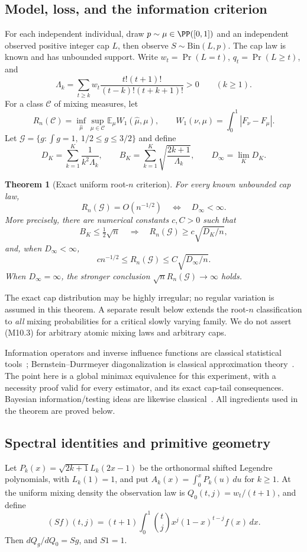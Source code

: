 \documentclass[11pt,a4paper]{article}
\newtheorem{theorem}{Theorem}[section]
\theoremstyle{definition}\newtheorem{definition}[theorem]{Definition}
\theoremstyle{remark}\newtheorem{remark}[theorem]{Remark}
\newcommand{\E}{\mathbb E}\newcommand{\one}{\mathbf 1}\newcommand{\1}{\mathbf 1}
\numberwithin{equation}{section}
\begin{document}
\subsection{Model, loss, and the information criterion}\label{M10-sec-1}
For each independent individual, draw $p\sim\mu\in\PP([0,1])$ and an independent observed positive integer cap $L$, then observe $S\sim\mathrm{Bin}(L,p)$. The cap law is known and has unbounded support. Write $w_t=\Pr(L=t)$, $q_t=\Pr(L\ge t)$, and
\[
 \Lambda_k=\sum_{t\ge k}w_t\frac{t!(t+1)!}{(t-k)!(t+k+1)!}>0
 \qquad(k\ge1).\tag{M10.1}
\]
For a class $\mathcal C$ of mixing measures, let
\[
 R_n(\mathcal C)=\inf_{\widehat\mu}\sup_{\mu\in\mathcal C}\E_\mu W_1(\widehat\mu,\mu),
 \qquad W_1(\nu,\mu)=\int_0^1|F_\nu-F_\mu|.
\]
Let $\mathcal G=\{g: \int g=1,\ 1/2\le g\le3/2\}$ and define
\[
 D_K=\sum_{k=1}^K\frac1{k^2\Lambda_k},\qquad
 B_K=\sum_{k=1}^K\sqrt{\frac{2k+1}{\Lambda_k}},\qquad
 D_\infty=\lim_KD_K.\tag{M10.2}
\]

\begin{theorem}[Exact uniform root-$n$ criterion]\label{M10-th:criterion}
For every known unbounded cap law,
\[
 R_n(\mathcal G)=O(n^{-1/2})
 \quad\Longleftrightarrow\quad D_\infty<\infty.\tag{M10.3}
\]
More precisely, there are numerical constants $c,C>0$ such that
\[
 B_K\le\tfrac12\sqrt n\quad\Longrightarrow\quad
 R_n(\mathcal G)\ge c\sqrt{D_K/n},\tag{M10.4}
\]
and, when $D_\infty<\infty$,
\[
 c n^{-1/2}\le R_n(\mathcal G)\le C\sqrt{D_\infty/n}.\tag{M10.5}
\]
When $D_\infty=\infty$, the stronger conclusion $\sqrt n R_n(\mathcal G)\to\infty$ holds.
\end{theorem}
The exact cap distribution may be highly irregular; no regular variation is assumed in this theorem. A separate result below extends the root-$n$ classification to \emph{all} mixing probabilities for a critical slowly varying family. We do not assert (M10.3) for arbitrary atomic mixing laws and arbitrary caps.

Information operators and inverse influence functions are classical statistical tools~\cite{ref026}; Bernstein--Durrmeyer diagonalization is classical approximation theory~\cite{ref021}. The point here is a global minimax equivalence for this experiment, with a necessity proof valid for every estimator, and its exact cap-tail consequences. Bayesian information/testing ideas are likewise classical~\cite{ref023}. All ingredients used in the theorem are proved below.

\subsection{Spectral identities and primitive geometry}\label{M10-sec-2}
Let $P_k(x)=\sqrt{2k+1}L_k(2x-1)$ be the orthonormal shifted Legendre polynomials, with $L_k(1)=1$, and put $A_k(x)=\int_0^xP_k(u)\,du$ for $k\ge1$. At the uniform mixing density the observation law is $Q_0(t,j)=w_t/(t+1)$, and define
\[
 (Sf)(t,j)=(t+1)\int_0^1\binom{t}{j}x^j(1-x)^{t-j}f(x)\,dx.
\]
Then $dQ_g/dQ_0=Sg$, and $S1=1$.
\end{document}
